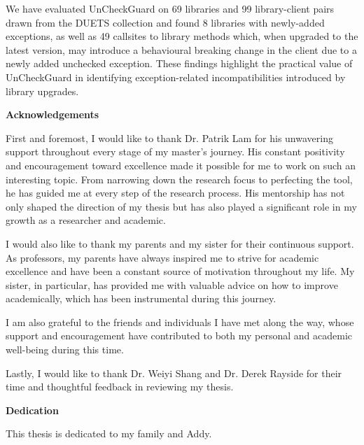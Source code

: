       We have evaluated UnCheckGuard on 69 libraries and 99 library-client pairs drawn from the DUETS collection
      and found 8 libraries with newly-added exceptions, as well as 49 callsites to library methods which,
      when upgraded to the latest version, may introduce
      a behavioural breaking change in the client due to a newly added unchecked exception. These findings
      highlight the practical value of UnCheckGuard in identifying exception-related incompatibilities
      introduced by library upgrades.

\cleardoublepage
{}    %

\begin{center}\textbf{Acknowledgements}\end{center}

First and foremost, I would like to thank Dr. Patrik Lam for his unwavering support throughout every stage of my master's journey. His constant positivity and encouragement toward excellence made it possible for me to work on such an interesting topic. From narrowing down the research focus to perfecting the tool, he has guided me at every step of the research process. His mentorship has not only shaped the direction of my thesis but has also played a significant role in my growth as a researcher and academic.

I would also like to thank my parents and my sister for their continuous support. As professors, my parents have always inspired me to strive for academic excellence and have been a constant source of motivation throughout my life. My sister, in particular, has provided me with valuable advice on how to improve academically, which has been instrumental during this journey.

I am also grateful to the friends and individuals I have met along the way, whose support and encouragement have contributed to both my personal and academic well-being during this time.

Lastly, I would like to thank Dr. Weiyi Shang and Dr. Derek Rayside for their time and thoughtful feedback in reviewing my thesis.
\cleardoublepage
{}    %


\begin{center}\textbf{Dedication}\end{center}
This thesis is dedicated to my family and Addy.
\cleardoublepage
{}    %



